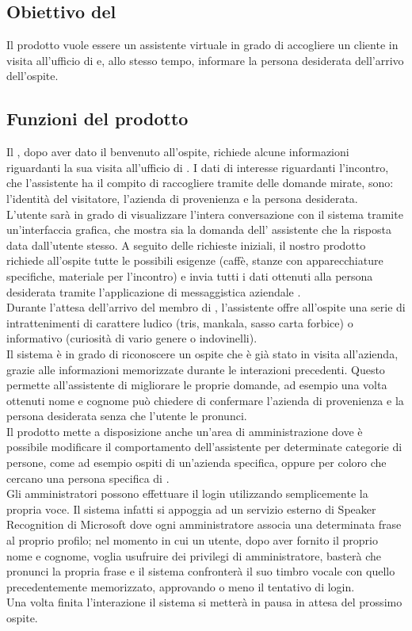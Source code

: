 \subsection{Obiettivo del }
Il prodotto vuole essere un assistente virtuale in grado di accogliere un cliente in visita all'ufficio di \PROPONENTE{} e, allo stesso tempo, informare la persona desiderata dell'arrivo dell'ospite. 
\subsection{Funzioni del prodotto}
Il , dopo aver dato il benvenuto all'ospite, richiede alcune informazioni riguardanti la sua visita all'ufficio di \PROPONENTE. I dati di interesse riguardanti l'incontro, che l'assistente ha il compito di raccogliere tramite delle domande mirate, sono: l'identità del visitatore, l'azienda di provenienza e la persona desiderata.\\
L'utente sarà in grado di visualizzare l'intera conversazione con il sistema tramite un'interfaccia grafica, che mostra sia la domanda dell' assistente che la risposta data dall'utente stesso.
A seguito delle richieste iniziali, il nostro prodotto richiede all'ospite tutte le possibili esigenze (caffè, stanze con apparecchiature specifiche, materiale per l'incontro) e invia tutti i dati ottenuti alla persona desiderata tramite l'applicazione di messaggistica aziendale .\\
Durante l'attesa dell'arrivo del membro di \PROPONENTE{}, l'assistente offre all'ospite una serie di intrattenimenti di carattere ludico (tris, mankala, sasso carta forbice) o informativo (curiosità di vario genere o indovinelli).\\
Il sistema è in grado di riconoscere un ospite che è già stato in visita all'azienda, grazie alle informazioni memorizzate durante le interazioni precedenti. Questo permette all'assistente di migliorare le proprie domande, ad esempio una volta ottenuti nome e cognome può chiedere di confermare l'azienda di provenienza e la persona desiderata senza che l'utente le pronunci.\\
Il prodotto mette a disposizione anche un'area di amministrazione dove è possibile modificare il comportamento dell'assistente per determinate categorie di persone, come ad esempio ospiti di un'azienda specifica, oppure per coloro che cercano una persona specifica di \PROPONENTE{}. \\
Gli amministratori possono effettuare il login utilizzando semplicemente la propria voce. Il sistema infatti si appoggia ad un servizio esterno di Speaker Recognition di Microsoft dove ogni amministratore associa una determinata frase al proprio profilo; nel momento in cui un utente, dopo aver fornito il proprio nome e cognome, voglia usufruire dei privilegi di amministratore, basterà che pronunci la propria frase e il sistema confronterà il suo timbro vocale con quello precedentemente memorizzato, approvando o meno il tentativo di login.\\
Una volta finita l'interazione il sistema si metterà in pausa in attesa del prossimo ospite.
